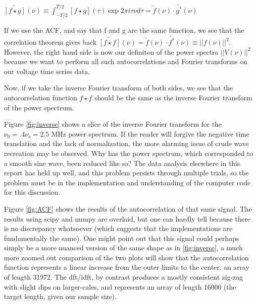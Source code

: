 \documentclass[a4paper]{article}
\begin{document}
\

$\widetilde{[f \star g]}(\nu) \equiv \int_{-T / 2}^{T / 2}[f \star g](\tau) \exp{2 \pi i \tau \nu} d \tau = \tilde{f}(\nu) \cdot \tilde{g^*}(\nu)$

If we use the ACF, and say that f and g are the same function, we see that the correlation theorem gives back $\widetilde{[f \star f]}(\nu) = \tilde{f}(\nu) \cdot \tilde{f^*}(\nu) \equiv ||f(\nu)||^2$. However, the right hand side is now our definiton of the power spectra $||V(\nu)||^2$ because we want to perform all such autocorrelations and Fourier transforms on our voltage time series data.

Now, if we take the inverse Fourier transform of both sides, we see that the autocorrelation function $f \star f$ should be the same as the inverse Fourier transform of the power spectrum.

Figure \ref{fig:inverse} shows a slice of the inverse Fourier transform for the $\nu_0 = .4 \nu_s = 2.5$ MHz power spectrum. If the reader will forgive the negative time translation and the lack of normalization, the more alarming issue of crude wave recreation may be observed. Why has the power spectrum, which corresponded to a smooth sine wave, been reduced like so? The data analysis elsewhere in this report has held up well, and this problem persists through multiple trials, so the problem must be in the implementation and understanding of the computer code for this discussion.

Figure \ref{fig:ACF} shows the results of the autocorrelation of that same signal. The results using scipy and numpy are overlaid, but one can hardly tell because there is no discrepancy whatsoever (which suggests that the implementations are fundamentally the same). One might point out that this signal could perhaps simply be a more nuanced version of the same shape as in \ref{fig:inverse}, a much more zoomed out comparison of the two plots will show that the autocorrelation function represents a linear increase from the outer limits to the center: an array of length 31972. The dft/idft, by contrast produces a mostly consistent zig-zag with slight dips on larger-cales, and represents an array of length 16000 (the target length, given our sample size).

\end{document}
